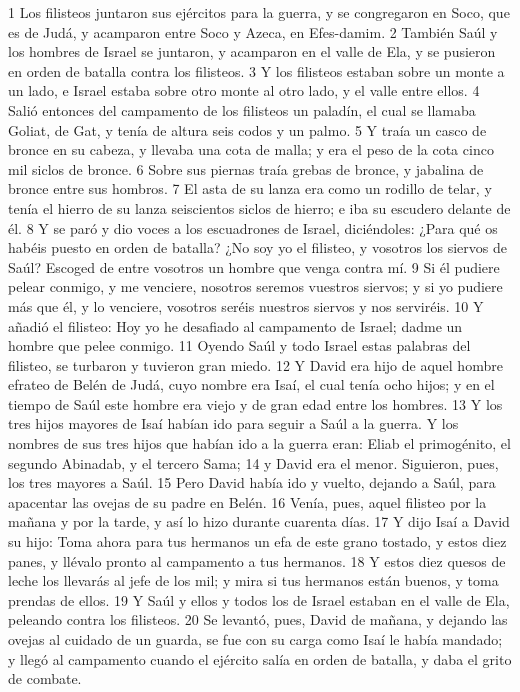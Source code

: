 1 Los filisteos juntaron sus ejércitos para la guerra, y se congregaron en Soco, que es de Judá, y acamparon entre Soco y Azeca, en Efes-damim.
2 También Saúl y los hombres de Israel se juntaron, y acamparon en el valle de Ela, y se pusieron en orden de batalla contra los filisteos.
3 Y los filisteos estaban sobre un monte a un lado, e Israel estaba sobre otro monte al otro lado, y el valle entre ellos.
4 Salió entonces del campamento de los filisteos un paladín, el cual se llamaba Goliat, de Gat, y tenía de altura seis codos   y un palmo.
5 Y traía un casco de bronce en su cabeza, y llevaba una cota de malla; y era el peso de la cota cinco mil siclos   de bronce.
6 Sobre sus piernas traía grebas de bronce, y jabalina de bronce entre sus hombros.
7 El asta de su lanza era como un rodillo de telar, y tenía el hierro de su lanza seiscientos siclos   de hierro; e iba su escudero delante de él.
8 Y se paró y dio voces a los escuadrones de Israel, diciéndoles: ¿Para qué os habéis puesto en orden de batalla? ¿No soy yo el filisteo, y vosotros los siervos de Saúl? Escoged de entre vosotros un hombre que venga contra mí.
9 Si él pudiere pelear conmigo, y me venciere, nosotros seremos vuestros siervos; y si yo pudiere más que él, y lo venciere, vosotros seréis nuestros siervos y nos serviréis.
10 Y añadió el filisteo: Hoy yo he desafiado al campamento de Israel; dadme un hombre que pelee conmigo.
11 Oyendo Saúl y todo Israel estas palabras del filisteo, se turbaron y tuvieron gran miedo.
12 Y David era hijo de aquel hombre efrateo de Belén de Judá, cuyo nombre era Isaí, el cual tenía ocho hijos; y en el tiempo de Saúl este hombre era viejo y de gran edad entre los hombres.
13 Y los tres hijos mayores de Isaí habían ido para seguir a Saúl a la guerra. Y los nombres de sus tres hijos que habían ido a la guerra eran: Eliab el primogénito, el segundo Abinadab, y el tercero Sama;
14 y David era el menor. Siguieron, pues, los tres mayores a Saúl.
15 Pero David había ido y vuelto, dejando a Saúl, para apacentar las ovejas de su padre en Belén.
16 Venía, pues, aquel filisteo por la mañana y por la tarde, y así lo hizo durante cuarenta días.
17 Y dijo Isaí a David su hijo: Toma ahora para tus hermanos un efa   de este grano tostado, y estos diez panes, y llévalo pronto al campamento a tus hermanos.
18 Y estos diez quesos de leche los llevarás al jefe de los mil; y mira si tus hermanos están buenos, y toma prendas de ellos.
19 Y Saúl y ellos y todos los de Israel estaban en el valle de Ela, peleando contra los filisteos.
20 Se levantó, pues, David de mañana, y dejando las ovejas al cuidado de un guarda, se fue con su carga como Isaí le había mandado; y llegó al campamento cuando el ejército salía en orden de batalla, y daba el grito de combate.
